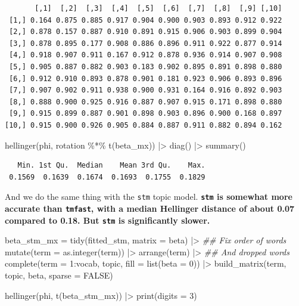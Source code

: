 \documentclass[
]{article}
\newenvironment{Shaded}{\begin{snugshade}}{\end{snugshade}}
\newcommand{\AttributeTok}[1]{\textcolor[rgb]{0.40,0.45,0.13}{#1}}
\newcommand{\ConstantTok}[1]{\textcolor[rgb]{0.56,0.35,0.01}{#1}}
\newcommand{\DecValTok}[1]{\textcolor[rgb]{0.68,0.00,0.00}{#1}}
\newcommand{\DocumentationTok}[1]{\textcolor[rgb]{0.37,0.37,0.37}{\textit{#1}}}
\newcommand{\FunctionTok}[1]{\textcolor[rgb]{0.28,0.35,0.67}{#1}}
\newcommand{\NormalTok}[1]{\textcolor[rgb]{0.00,0.23,0.31}{#1}}
\newcommand{\OtherTok}[1]{\textcolor[rgb]{0.00,0.23,0.31}{#1}}
\newcommand{\SpecialCharTok}[1]{\textcolor[rgb]{0.37,0.37,0.37}{#1}}
\newcommand{\StringTok}[1]{\textcolor[rgb]{0.13,0.47,0.30}{#1}}
\begin{document}
\begin{verbatim}
       [,1]  [,2]  [,3]  [,4]  [,5]  [,6]  [,7]  [,8]  [,9] [,10]
 [1,] 0.164 0.875 0.885 0.917 0.904 0.900 0.903 0.893 0.912 0.922
 [2,] 0.878 0.157 0.887 0.910 0.891 0.915 0.906 0.903 0.899 0.904
 [3,] 0.878 0.895 0.177 0.908 0.886 0.896 0.911 0.922 0.877 0.914
 [4,] 0.918 0.907 0.911 0.167 0.912 0.878 0.936 0.914 0.907 0.908
 [5,] 0.905 0.887 0.882 0.903 0.183 0.902 0.895 0.891 0.898 0.880
 [6,] 0.912 0.910 0.893 0.878 0.901 0.181 0.923 0.906 0.893 0.896
 [7,] 0.907 0.902 0.911 0.938 0.900 0.931 0.164 0.916 0.892 0.903
 [8,] 0.888 0.900 0.925 0.916 0.887 0.907 0.915 0.171 0.898 0.880
 [9,] 0.915 0.899 0.887 0.901 0.898 0.903 0.896 0.900 0.168 0.897
[10,] 0.915 0.900 0.926 0.905 0.884 0.887 0.911 0.882 0.894 0.162
\end{verbatim}

\begin{Shaded}
\begin{Highlighting}[]
\FunctionTok{hellinger}\NormalTok{(phi, rotation }\SpecialCharTok{\%*\%} \FunctionTok{t}\NormalTok{(beta\_mx)) }\SpecialCharTok{|\textgreater{}}
    \FunctionTok{diag}\NormalTok{() }\SpecialCharTok{|\textgreater{}}
    \FunctionTok{summary}\NormalTok{()}
\end{Highlighting}
\end{Shaded}

\begin{verbatim}
   Min. 1st Qu.  Median    Mean 3rd Qu.    Max. 
 0.1569  0.1639  0.1674  0.1693  0.1755  0.1829 
\end{verbatim}

And we do the same thing with the \texttt{stm} topic model.
\textbf{\texttt{stm} is somewhat more accurate than \texttt{tmfast},
with a median Hellinger distance of about 0.07 compared to 0.18. But
\texttt{stm} is significantly slower.}

\begin{Shaded}
\begin{Highlighting}[]
\NormalTok{beta\_stm\_mx }\OtherTok{=} \FunctionTok{tidy}\NormalTok{(fitted\_stm, }\AttributeTok{matrix =} \StringTok{\textquotesingle{}beta\textquotesingle{}}\NormalTok{) }\SpecialCharTok{|\textgreater{}} 
    \DocumentationTok{\#\# Fix order of words}
    \FunctionTok{mutate}\NormalTok{(}\AttributeTok{term =} \FunctionTok{as.integer}\NormalTok{(term)) }\SpecialCharTok{|\textgreater{}}
    \FunctionTok{arrange}\NormalTok{(term) }\SpecialCharTok{|\textgreater{}}
    \DocumentationTok{\#\# And dropped words}
    \FunctionTok{complete}\NormalTok{(}\AttributeTok{term =} \DecValTok{1}\SpecialCharTok{:}\NormalTok{vocab, topic, }
             \AttributeTok{fill =} \FunctionTok{list}\NormalTok{(}\AttributeTok{beta =} \DecValTok{0}\NormalTok{)) }\SpecialCharTok{|\textgreater{}}
    \FunctionTok{build\_matrix}\NormalTok{(term, topic, beta, }\AttributeTok{sparse =} \ConstantTok{FALSE}\NormalTok{)}

\FunctionTok{hellinger}\NormalTok{(phi, }\FunctionTok{t}\NormalTok{(beta\_stm\_mx)) }\SpecialCharTok{|\textgreater{}} 
    \FunctionTok{print}\NormalTok{(}\AttributeTok{digits =} \DecValTok{3}\NormalTok{)}
\end{Highlighting}
\end{Shaded}
\end{document}
